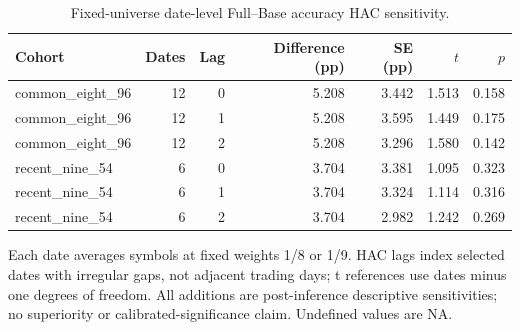 \begin{table}[htbp]
\centering\small
\caption{Fixed-universe date-level Full--Base accuracy HAC sensitivity.}
\label{tab:d205_hac}
\setlength{\tabcolsep}{3.5pt}
\begin{tabular}{lrrrrrr}
\hline
Cohort & Dates & Lag & Difference (pp) & SE (pp) & $t$ & $p$ \\
\hline
common\_eight\_96 & 12 & 0 & 5.208 & 3.442 & 1.513 & 0.158 \\
common\_eight\_96 & 12 & 1 & 5.208 & 3.595 & 1.449 & 0.175 \\
common\_eight\_96 & 12 & 2 & 5.208 & 3.296 & 1.580 & 0.142 \\
recent\_nine\_54 & 6 & 0 & 3.704 & 3.381 & 1.095 & 0.323 \\
recent\_nine\_54 & 6 & 1 & 3.704 & 3.324 & 1.114 & 0.316 \\
recent\_nine\_54 & 6 & 2 & 3.704 & 2.982 & 1.242 & 0.269 \\
\hline
\end{tabular}
\par\smallskip\footnotesize Each date averages symbols at fixed weights 1/8 or 1/9. HAC lags index selected dates with irregular gaps, not adjacent trading days; t references use dates minus one degrees of freedom. All additions are post-inference descriptive sensitivities; no superiority or calibrated-significance claim. Undefined values are NA.
\end{table}
